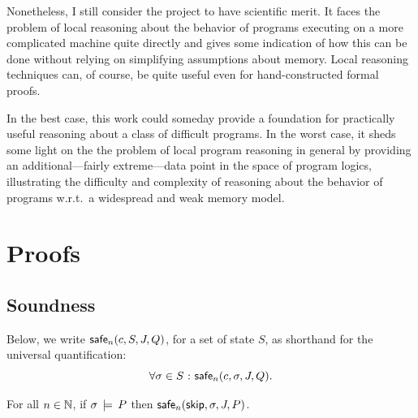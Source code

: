 \documentclass[11pt]{report}
\begin{document}
Nonetheless, I still consider the project to have scientific merit. It faces the problem of local reasoning about the behavior of programs executing on a more complicated machine quite directly and gives some indication of how this can be done without relying on simplifying assumptions about memory. Local reasoning techniques can, of course, be quite useful even for hand-constructed formal proofs. 

In the best case, this work could someday provide a foundation for practically useful reasoning about a class of difficult programs. In the worst case, it sheds some light on the the problem of local program reasoning in general by providing an additional---fairly extreme---data point in the space of program logics, illustrating the difficulty and complexity of reasoning about the behavior of programs w.r.t.~a widespread and weak memory model. 



 

\appendix

\chapter{Proofs}

\section{Soundness}
\label{sec:soundness-proofs}
Below, we write $\mathsf{safe}_{n}(c,S,J,Q)$, for a set of state $S$, as shorthand for the universal quantification: \[ \forall \sigma \in S \operatorname{\,:\,} \mathsf{safe}_{n}(c,\sigma,J,Q).\]

\begin{lemma}
	\label{lem:skip-safe}
	For all $n \in \mathbb{N}$, if $\sigma \,\models\, P$ then $\mathsf{safe}_{n}(\operatorname{\mathsf{skip}},\sigma,J,P)$. 
\end{lemma}
\end{document}
